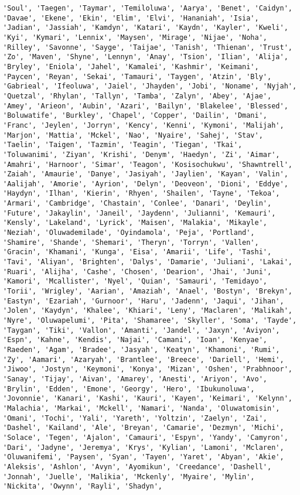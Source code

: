 \documentclass[11pt]{article}
\begin{document}
\begin{Verbatim}[commandchars=\\\{\}]
'Soul', 'Taegen', 'Taymar', 'Temiloluwa', 'Aarya', 'Benet', 'Caidyn', 'Davae', 'Ekene', 'Ekin', 'Elim', 'Elvi', 'Hananiah', 'Isia', 'Jadian', 'Jassiah', 'Kamdyn', 'Katari', 'Kaydn', 'Kayler', 'Kweli', 'Kyi', 'Kymari', 'Lennix', 'Maysen', 'Mirage', 'Nijae', 'Noha', 'Rilley', 'Savonne', 'Sayge', 'Taijae', 'Tanish', 'Thienan', 'Trust', 'Zo', 'Maven', 'Shyne', 'Lennyn', 'Anay', 'Tsion', 'Ilian', 'Alija', 'Bryley', 'Eniola', 'Jahel', 'Kamalei', 'Kashmir', 'Keimani', 'Paycen', 'Reyan', 'Sekai', 'Tamauri', 'Taygen', 'Atzin', 'Bly', 'Gabrieal', 'Ifeoluwa', 'Jaiel', 'Jhayden', 'Jobi', 'Noname', 'Nyjah', 'Quetzal', 'Rhylan', 'Tallyn', 'Tamba', 'Zalyn', 'Abey', 'Ajae', 'Amey', 'Arieon', 'Aubin', 'Azari', 'Bailyn', 'Blakelee', 'Blessed', 'Boluwatife', 'Burkley', 'Chapel', 'Copper', 'Dailin', 'Dmani', 'Franc', 'Jeylen', 'Jorryn', 'Kency', 'Kenni', 'Kymoni', 'Malijah', 'Marjon', 'Mattia', 'Mckel', 'Nao', 'Nyaire', 'Sahej', 'Stav', 'Taelin', 'Taigen', 'Tazmin', 'Teagin', 'Tiegan', 'Tkai', 'Toluwanimi', 'Ziyan', 'Krishi', 'Denym', 'Haedyn', 'Zi', 'Aimar', 'Amahri', 'Harnoor', 'Simar', 'Teagon', 'Kosisochukwu', 'Shawntrell', 'Zaiah', 'Amaurie', 'Danye', 'Jasiyah', 'Jaylien', 'Kayan', 'Valin', 'Aalijah', 'Amorie', 'Ayrion', 'Delyn', 'Deoveon', 'Dioni', 'Eddye', 'Haydyn', 'Ilhan', 'Kierin', 'Rhyen', 'Shailen', 'Tayne', 'Tekoa', 'Armari', 'Cambridge', 'Chastain', 'Conlee', 'Danari', 'Deylin', 'Future', 'Jakaylin', 'Janeil', 'Jaydenn', 'Julianni', 'Kemauri', 'Kensly', 'Lakeland', 'Lyrick', 'Maisen', 'Malakia', 'Mikayle', 'Neziah', 'Oluwademilade', 'Oyindamola', 'Peja', 'Portland', 'Shamire', 'Shande', 'Shemari', 'Theryn', 'Torryn', 'Vallen', 'Gracin', 'Khamani', 'Kunga', 'Eisa', 'Amarii', 'Life', 'Tashi', 'Tavi', 'Aliyan', 'Brighten', 'Dalys', 'Damarie', 'Juliani', 'Lakai', 'Ruari', 'Alijha', 'Cashe', 'Chosen', 'Dearion', 'Jhai', 'Juni', 'Kamori', 'Mcallister', 'Nyel', 'Quian', 'Samauri', 'Temidayo', 'Torii', 'Wrigley', 'Aarian', 'Amaziah', 'Anael', 'Bostyn', 'Brekyn', 'Eastyn', 'Ezariah', 'Gurnoor', 'Haru', 'Jadenn', 'Jaqui', 'Jihan', 'Jolen', 'Kaydyn', 'Khalee', 'Khiari', 'Leny', 'Maclaren', 'Malikah', 'Nyre', 'Oluwapelumi', 'Pita', 'Shamaree', 'Skyller', 'Soma', 'Tayde', 'Taygan', 'Tiki', 'Vallon', 'Amanti', 'Jandel', 'Jaxyn', 'Aviyon', 'Espn', 'Kahne', 'Kendis', 'Najai', 'Camani', 'Ioan', 'Kenyae', 'Raeden', 'Agam', 'Bradee', 'Jasyah', 'Keatyn', 'Khamoni', 'Rumi', 'Zy', 'Aamari', 'Azaryah', 'Brantlee', 'Breece', 'Dariell', 'Hemi', 'Jiwoo', 'Jostyn', 'Keymoni', 'Konya', 'Mizan', 'Oshen', 'Prabhnoor', 'Sanay', 'Tijay', 'Aivan', 'Amarey', 'Anesti', 'Ariyon', 'Avo', 'Brylin', 'Edden', 'Emone', 'Georgy', 'Hero', 'Ibukunoluwa', 'Jovonnie', 'Kanari', 'Kashi', 'Kauri', 'Kayen', 'Keimari', 'Kelynn', 'Malachia', 'Markai', 'Mckell', 'Namari', 'Nanda', 'Oluwatomisin', 'Omani', 'Tochi', 'Yali', 'Yareth', 'Yoltzin', 'Zaelyn', 'Zai', 'Dashel', 'Kailand', 'Ale', 'Breyan', 'Camarie', 'Dezmyn', 'Michi', 'Solace', 'Tegen', 'Ajalon', 'Camauri', 'Espyn', 'Yandy', 'Camyron', 'Dari', 'Jadyne', 'Jeremya', 'Krys', 'Kylian', 'Lamoni', 'Mclaren', 'Oluwanifemi', 'Paysen', 'Syan', 'Tayen', 'Yaret', 'Abyan', 'Akie', 'Aleksis', 'Ashlon', 'Avyn', 'Ayomikun', 'Creedance', 'Dashell', 'Jonnah', 'Juelle', 'Malikia', 'Mckenly', 'Myaire', 'Mylin', 'Nickita', 'Owynn', 'Rayli', 'Shadyn', 
\end{Verbatim}
\end{document}
